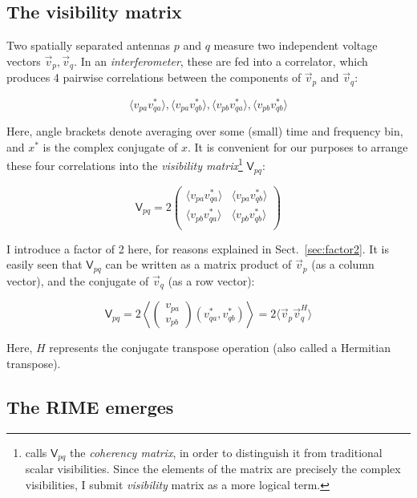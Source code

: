 \documentclass{aa}
\newcommand{\matrixtt}[4]{\left( \begin{array}{cc}#1&#2\\#3&#4\\\end{array} \right)}
\newcommand{\herm}{H}
\newcommand{\coh}[2]{\mathsf{{#1}}_{{#2}}}
\begin{document}
\subsection{The visibility matrix}

Two spatially separated antennas $p$ and $q$ measure two independent voltage vectors $\vec v_p,\vec v_q$. In an {\em interferometer}, these are fed into a correlator, which produces 4 pairwise correlations between the components of $\vec v_p$ and $\vec v_q$:

    \begin{equation}\label{eq:correlation}
    \langle v_{pa}v^*_{qa}\rangle, \langle v_{pa}v^*_{qb}\rangle, 
    \langle v_{pb}v^*_{qa}\rangle, \langle v_{pb}v^*_{qb}\rangle
    \end{equation}

Here, angle brackets denote averaging over some (small) time and frequency bin, and $x^*$ is the complex conjugate of $x$.  It is convenient for our purposes to arrange these four correlations into the {\em visibility matrix\/}\footnote{\citet{ME4} calls $\coh{V}{pq}$ the {\em coherency matrix}, in order to distinguish it from traditional scalar visibilities. Since the elements of the matrix are precisely the complex visibilities, I submit {\em visibility} matrix as a more logical term.} $\coh{V}{pq}$:

    \[
    \coh{V}{pq} = 2 \matrixtt{\langle v_{pa}v^*_{qa}\rangle}{\langle v_{pa}v^*_{qb}\rangle}{\langle v_{pb}v^*_{qa}\rangle}{\langle v_{pb}v^*_{qb}\rangle}
    \]

I introduce a factor of 2 here, for reasons explained in Sect.~\ref{sec:factor2}. It is easily seen that $\coh{V}{pq}$ can be written as a matrix product of $\vec v_p$ (as a column vector), and the conjugate of $\vec v_q$ (as a row vector):

\begin{equation}\label{eq:coherency}
\coh{V}{pq} = 2 \left<\left( \begin{array}{c}v_{pa}\\v_{pb}\end{array} \right) (v^*_{qa},v^*_{qb}) \right > = 2 \langle \vec v_p \vec v^\herm_q \rangle
\end{equation}

Here, $\herm$ represents the conjugate transpose operation (also called a Hermitian transpose).

\subsection{\label{sec:RIME-emerges}The RIME emerges}
\end{document}
